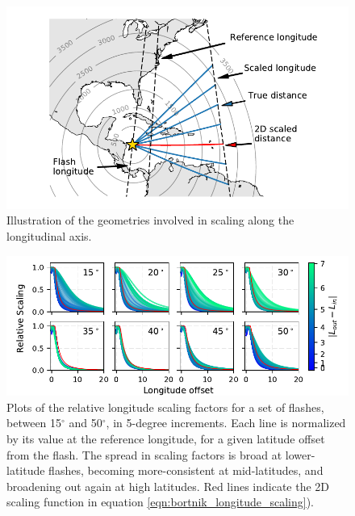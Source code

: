 \begin{figure}[h!]
\begin{center}
\includegraphics{figures/longitude_scaling_diagram.pdf}
\caption[2D vs 3D longitude scaling geometries]{Illustration of the geometries involved in scaling along the longitudinal axis.}
\label{fig:longitude_scaling_diagram}
\end{center}
\end{figure}

\begin{figure}[h!]
\begin{center}
\includegraphics{figures/longitude_scaling_per_latitude_with_colorbar.pdf}
\caption[Relative longitude scaling factors per latitude]{Plots of the relative longitude scaling factors for a set of flashes, between 15$^\circ$ and 50$^\circ$, in 5-degree increments. Each line is normalized by its value at the reference longitude, for a given latitude offset from the flash. The spread in scaling factors is broad at lower-latitude flashes, becoming more-consistent at mid-latitudes, and broadening out again at high latitudes. Red lines indicate the 2D scaling function in equation \eqref{eqn:bortnik_longitude_scaling}).}
\label{fig:longitude_scaling_per_latitude}
\end{center}
\end{figure}

